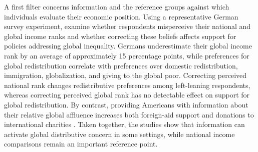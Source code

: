 \documentclass[11pt,a4paper]{article}
\begin{document}
A first filter concerns information and the reference groups against which individuals evaluate their economic position. Using a representative German survey experiment, \citet{fehr_your_2019} %
examine whether respondents misperceive their national and global income ranks and whether correcting these beliefs affects support for policies addressing global inequality. Germans underestimate their global income rank by an average of approximately 15 percentage points, while preferences for global redistribution correlate with preferences over domestic redistribution, immigration, globalization, and giving to the global poor. Correcting perceived national rank changes redistributive preferences among left-leaning respondents, %
whereas correcting perceived global rank has no detectable effect on support for global redistribution. 
By contrast, providing Americans with information about their relative global affluence increases both foreign-aid support and donations to international charities \citep{nair_misperceptions_2018}. %
Taken together, the studies show that information can activate global distributive concern in some settings, while national income comparisons remain an important reference point. %
\end{document}
